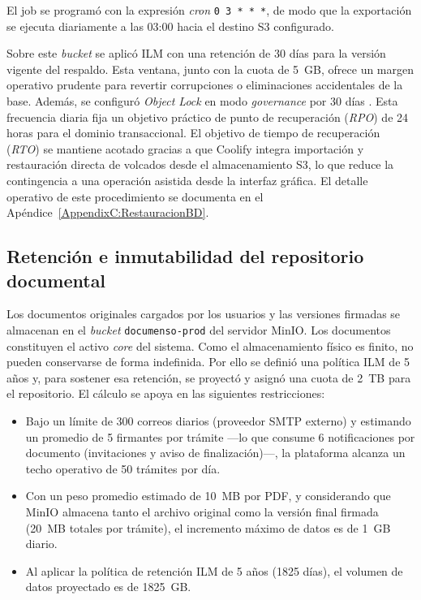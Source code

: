 El job se programó con la expresión \textit{cron} \texttt{0 3 * * *}, de modo que la exportación se ejecuta diariamente a las 03:00 hacia el destino S3 configurado.

Sobre este \textit{bucket} se aplicó ILM con una retención de 30 días para la versión vigente del respaldo. Esta ventana, junto con la cuota de 5~GB, ofrece un margen operativo prudente para revertir corrupciones o eliminaciones accidentales de la base. Además, se configuró \textit{Object Lock} en modo \textit{governance} por 30 días \cite{minio_object_locking}. Esta frecuencia diaria fija un objetivo práctico de punto de recuperación (\textit{RPO}) de 24 horas para el dominio transaccional. El objetivo de tiempo de recuperación (\textit{RTO}) se mantiene acotado gracias a que Coolify integra importación y restauración directa de volcados desde el almacenamiento S3, lo que reduce la contingencia a una operación asistida desde la interfaz gráfica. El detalle operativo de este procedimiento se documenta en el Apéndice~\ref{AppendixC:RestauracionBD}.

\subsection{Retención e inmutabilidad del repositorio documental}

Los documentos originales cargados por los usuarios y las versiones firmadas se almacenan en el \textit{bucket} \texttt{documenso-prod} del servidor MinIO. Los documentos constituyen el activo \textit{core} del sistema. Como el almacenamiento físico es finito, no pueden conservarse de forma indefinida. Por ello se definió una política ILM de 5 años y, para sostener esa retención, se proyectó y asignó una cuota de 2~TB para el repositorio. El cálculo se apoya en las siguientes restricciones:
\begin{itemize}
    \item Bajo un límite de 300 correos diarios (proveedor SMTP externo) y estimando un promedio de 5 firmantes por trámite ---lo que consume 6 notificaciones por documento (invitaciones y aviso de finalización)---, la plataforma alcanza un techo operativo de 50 trámites por día.
    \item Con un peso promedio estimado de 10~MB por PDF, y considerando que MinIO almacena tanto el archivo original como la versión final firmada (20~MB totales por trámite), el incremento máximo de datos es de 1~GB diario.
    \item Al aplicar la política de retención ILM de 5 años (1825 días), el volumen de datos proyectado es de 1825~GB.
\end{itemize}

